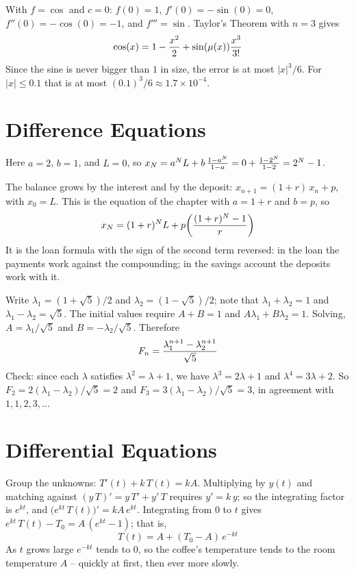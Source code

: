  With $f = \cos$ and $c = 0$: $f(0) = 1$, $f'(0) = -\sin(0) = 0$,
$f''(0) = -\cos(0) = -1$, and $f''' = \sin$. Taylor's Theorem with
$n = 3$ gives
$$
\cos(x) = 1 - {x^2 \over 2} + \sin(\mu(x)) {x^3 \over 3!}
$$
Since the sine is never bigger than $1$ in size, the error is at most
$|x|^3/6$. For $|x| \le 0.1$ that is at most $(0.1)^3/6 \approx 1.7 \times
10^{-4}$.

\section{Difference Equations}

 Here $a = 2$, $b = 1$, and $L = 0$, so
$x_N = a^N L + b\,{1 - a^N \over 1 - a} = 0 + {1 - 2^N \over 1 - 2} = 2^N - 1$.

 The balance grows by the interest and by the deposit:
$x_{n+1} = (1 + r)\, x_n + p$, with $x_0 = L$. This is the equation of the
chapter with $a = 1 + r$ and $b = p$, so
$$
x_N = (1+r)^N L + p \biggl( {(1+r)^N - 1 \over r} \biggr)
$$
It is the loan formula with the sign of the second term reversed: in the
loan the payments work against the compounding; in the savings account
the deposits work with it.

 Write $\lambda_1 = (1 + \sqrt 5)/2$ and $\lambda_2 = (1 - \sqrt 5)/2$;
note that $\lambda_1 + \lambda_2 = 1$ and $\lambda_1 - \lambda_2 = \sqrt 5$.
The initial values require $A + B = 1$ and $A \lambda_1 + B \lambda_2 = 1$.
Solving, $A = \lambda_1 / \sqrt 5$ and $B = -\lambda_2 / \sqrt 5$. Therefore
$$
F_n = {\lambda_1^{n+1} - \lambda_2^{n+1} \over \sqrt 5}
$$
Check: since each $\lambda$ satisfies $\lambda^2 = \lambda + 1$, we have
$\lambda^3 = 2 \lambda + 1$ and $\lambda^4 = 3 \lambda + 2$. So
$F_2 = 2 (\lambda_1 - \lambda_2)/\sqrt 5 = 2$ and
$F_3 = 3 (\lambda_1 - \lambda_2)/\sqrt 5 = 3$, in agreement with
$1, 1, 2, 3, \ldots$

\section{Differential Equations}

 Group the unknowns: $T'(t) + k\, T(t) = k A$. Multiplying by $y(t)$
and matching against $(y\, T)' = y\, T' + y'\, T$ requires $y' = k\, y$; so
the integrating factor is $e^{k t}$, and
$\bigl( e^{k t}\, T(t) \bigr)' = k A\, e^{k t}$. Integrating from $0$ to $t$
gives $e^{k t}\, T(t) - T_0 = A\, (e^{k t} - 1)$; that is,
$$
T(t) = A + (T_0 - A)\, e^{-k t}
$$
As $t$ grows large $e^{-k t}$ tends to $0$, so the coffee's temperature
tends to the room temperature $A$ -- quickly at first, then ever more
slowly.

